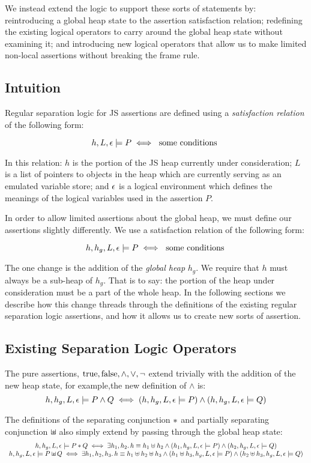 \documentclass[a4paper,notitlepage]{report}
\begin{document}
We instead extend the logic to support these sorts of statements by: reintroducing a global heap state to the
assertion satisfaction relation; redefining the existing logical operators to
carry around the global heap state without examining it; and introducing new
logical operators that allow us to make limited non-local assertions without
breaking the frame rule.

\subsection{Intuition}
\label{sec:extendingseplog:intuition}

Regular separation logic for JS assertions are defined using a
\emph{satisfaction relation} of the following form:

\[
h,L,\epsilon \models P \iff \text{ some conditions }
\]

In this relation: $h$ is the portion of the JS heap currently under
consideration; $L$ is a list of pointers to objects in the heap which are
currently serving as an emulated variable store; and $\epsilon$ is a logical
environment which defines the meanings of the logical variables used in the
assertion $P$.

In order to allow limited assertions about the global heap, we must define our
assertions slightly differently. We use a satisfaction relation of the following
form:

\[
h,h_g,L,\epsilon \models P \iff \text{ some conditions }
\]

The one change is the addition of the \emph{global heap} $h_g$. We require that
$h$ must always be a sub-heap of $h_g$. That is to say: the portion of the heap
under consideration must be a part of the whole heap. In the following sections
we describe how this change threads through the definitions of the existing
regular separation logic assertions, and how it allows us to create new sorts of
assertion.

\subsection{Existing Separation Logic Operators}
The pure assertions, $\text{true},\text{false},\land,\lor,\lnot$ extend trivially with the
addition of the new heap state, for example,the new definition of $\land$ is:
\[
  h,h_g,L,\epsilon \models P \land Q \iff
    (h,h_g,L,\epsilon \models P) \land (h,h_g,L,\epsilon \models Q)
\]

The definitions of the separating conjunction $\mathbin{*}$ and partially separating
conjunction $\mathbin{\sqcup\mkern-10mu*}$ also simply extend by passing through the global heap state:
\[\begin{array}{c}
  h,h_g,L,\epsilon \models P \mathbin{*} Q \iff
    \exists h_1,h_2 \mathpunct{.} h \equiv h_1 \uplus h_2 \land
    (h_1,h_g,L,\epsilon \models P) \land (h_2,h_g,L,\epsilon \models Q) \\
  h,h_g,L,\epsilon \models P \mathbin{\sqcup\mkern-10mu*} Q \iff
    \exists h_1,h_2,h_3 \mathpunct{.} h \equiv h_1 \uplus h_2 \uplus h_3 \land
    (h_1 \uplus h_3, h_g, L, \epsilon \models P) \land
    (h_2 \uplus h_3, h_g, L, \epsilon \models Q)
\end{array}\]
\end{document}

